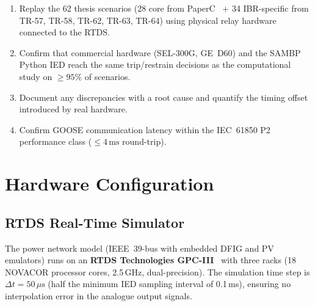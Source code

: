 \documentclass[11pt, a4paper]{article}
\begin{document}
\begin{enumerate}
  \item Replay the 62 thesis scenarios (28 core from PaperC~\cite{SAMBP_TR66}
    + 34 IBR-specific from TR-57, TR-58, TR-62, TR-63, TR-64) using physical
    relay hardware connected to the RTDS.
  \item Confirm that commercial hardware (SEL-300G, GE~D60) and the SAMBP
    Python IED reach the same trip/restrain decisions as the computational
    study on $\geq 95\%$ of scenarios.
  \item Document any discrepancies with a root cause and quantify the
    timing offset introduced by real hardware.
  \item Confirm GOOSE communication latency within the IEC~61850 P2
    performance class ($\leq 4\,\text{ms}$ round-trip).
\end{enumerate}

\section{Hardware Configuration}
\label{sec:hardware}

\subsection{RTDS Real-Time Simulator}

The power network model (IEEE~39-bus with embedded DFIG and PV emulators)
runs on an \textbf{RTDS Technologies GPC-III}~\cite{RTDS2024} with
three racks (18 NOVACOR processor cores, 2.5\,GHz, dual-precision).
The simulation time step is $\Delta t = 50\,\mu\text{s}$ (half the
minimum IED sampling interval of 0.1\,ms), ensuring no interpolation error
in the analogue output signals.
\end{document}
